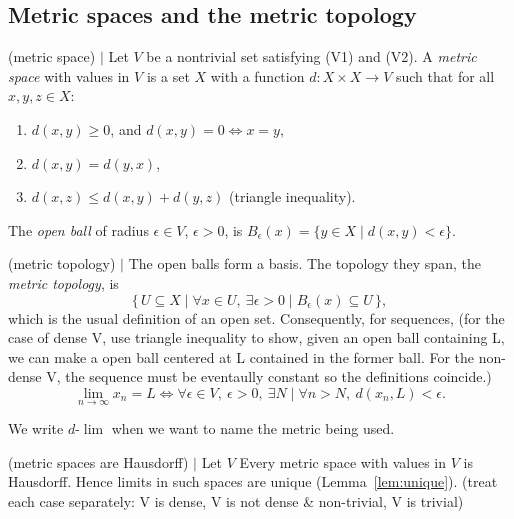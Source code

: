 
\subsection{Metric spaces and the metric topology}

\begin{definition} (metric space) $\mid$
Let $V$ be a nontrivial set satisfying (V1) and (V2). A \emph{metric space}
with values in $V$ is a set $X$ with a function $d:X\times X\to V$ such that
for all $x,y,z\in X$:
\begin{enumerate}[nosep,leftmargin=3em]
    \item $d(x,y)\ge 0$, and $d(x,y)=0 \iff x=y$,
    \item $d(x,y)=d(y,x)$,
    \item $d(x,z)\le d(x,y)+d(y,z)$ (triangle inequality).
\end{enumerate}
The \emph{open ball} of radius $\epsilon\in V$, $\epsilon>0$, is
$B_\epsilon(x) = \{y\in X \mid d(x,y)<\epsilon\}$.
\end{definition}

\begin{lemma} (metric topology) $\mid$ \label{lem:metrictop}
The open balls form a basis. The topology they span, the \emph{metric
topology}, is
\[
\{\,U\subseteq X \mid \forall x\in U,\ \exists\epsilon>0 \mid
B_\epsilon(x)\subseteq U\,\},
\]
which is the usual definition of an open set. Consequently, for sequences, (for the case of dense V, use triangle inequality to show, given an open ball containing L, we can make a open ball centered at L contained in the former ball. For the non-dense V, the sequence must be eventaully constant so the definitions coincide.)
\[
\lim_{n\to\infty} x_n = L
\iff
\forall \epsilon\in V,\ \epsilon>0,\ \exists N \mid \forall n>N,\ d(x_n,L)<\epsilon .
\]
\end{lemma}

We write $d\text{-}\lim$ when we want to name the metric being used.

\begin{lemma} (metric spaces are Hausdorff) $\mid$ \label{lem:hausdorff}
Let $V$  Every metric space with values in $V$ is Hausdorff. Hence
limits in such spaces are unique (Lemma~\ref{lem:unique}). (treat each case separately: V is dense, V is not dense \& non-trivial, V is trivial)
\end{lemma}

